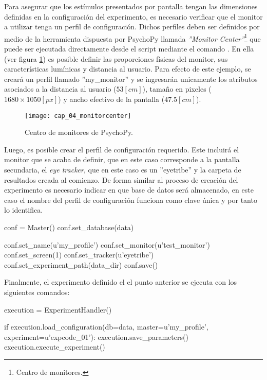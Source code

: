 \documentclass[\main/main.tex]{subfiles}
\begin{document}
        Para asegurar que los estímulos presentados por pantalla tengan las dimensiones definidas en la configuración del experimento, es necesario verificar que el monitor a utilizar tenga un perfil de configuración. Dichos perfiles deben ser definidos por medio de la herramienta dispuesta por PsychoPy llamada \textit{''Monitor Center''}\footnote{Centro de monitores.} que puede ser ejecutada directamente desde el script mediante el comando . En ella (ver figura \ref{fig:04_monitor_center}) es posible definir las proporciones físicas del monitor, sus características lumínicas y distancia al usuario. Para efecto de este ejemplo, se creará un perfil llamado ''my\_monitor'' y se ingresarán unicamente los atributos asociados a la distancia al usuario ($53[cm]$), tamaño en pixeles ($1680\times1050[px]$) y ancho efectivo de la pantalla ($47.5[cm]$).
        \begin{figure}[H]
            \centering
            \texttt{[image: cap\_04\_monitorcenter]}
            \caption{Centro de monitores de PsychoPy.}
            \label{fig:04_monitor_center}
        \end{figure} 

        Luego, es posible crear el perfil de configuración requerido. Este incluirá el monitor que se acaba de definir, que en este caso corresponde a la pantalla secundaria, el \textit{eye tracker}, que en este caso es un ''eyetribe'' y la carpeta de resultados creada al comienzo. De forma similar al proceso de creación del experimento es necesario indicar en que base de datos será almacenado, en este caso el nombre del perfil de configuración funciona como clave única y por tanto lo identifica.

\begin{singlespace}\begin{python}
conf = Master()
conf.set_database(data)

conf.set_name(u'my_profile')
conf.set_monitor(u'test_monitor')
conf.set_screen(1)
conf.set_tracker(u'eyetribe')
conf.set_experiment_path(data_dir)
conf.save()
\end{python}\end{singlespace}

        Finalmente, el experimento definido el el punto anterior se ejecuta con los siguientes comandos:

\begin{singlespace}\begin{python}
execution = ExperimentHandler()

if execution.load_configuration(db=data, master=u'my_profile', experiment=u'expcode_01'):
    execution.save_parameters()
    execution.execute_experiment()
\end{python}\end{singlespace}  
\end{document}
